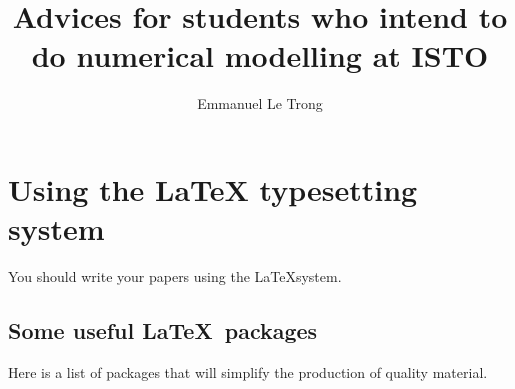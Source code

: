 \documentclass[a4paper]{article}
\title{Advices for students who intend to do numerical modelling at ISTO}
\author{Emmanuel Le Trong}
\begin{document}
\maketitle

\tableofcontents

\section{Using the \LaTeX{} typesetting system}

You should write your papers using the \LaTeX system. 

\subsection{Some useful \LaTeX\ packages}

Here is a list of packages that will simplify the production of quality material.
\end{document}
